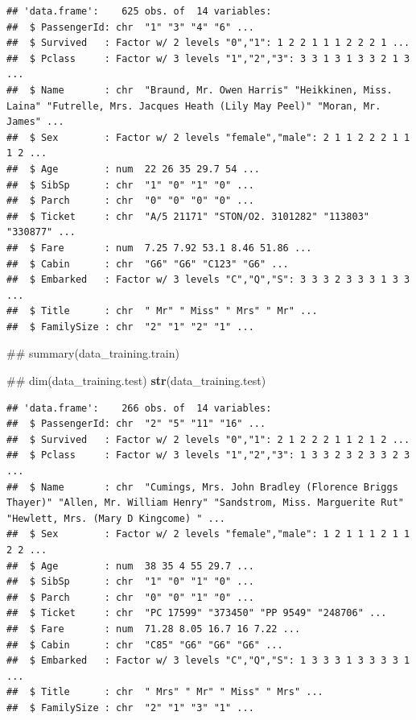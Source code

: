 \documentclass[]{article}
\newenvironment{Shaded}{\begin{snugshade}}{\end{snugshade}}
\newcommand{\KeywordTok}[1]{\textcolor[rgb]{0.13,0.29,0.53}{\textbf{{#1}}}}
\newcommand{\NormalTok}[1]{{#1}}
\begin{document}
\begin{verbatim}
## 'data.frame':    625 obs. of  14 variables:
##  $ PassengerId: chr  "1" "3" "4" "6" ...
##  $ Survived   : Factor w/ 2 levels "0","1": 1 2 2 1 1 1 2 2 2 1 ...
##  $ Pclass     : Factor w/ 3 levels "1","2","3": 3 3 1 3 1 3 3 2 1 3 ...
##  $ Name       : chr  "Braund, Mr. Owen Harris" "Heikkinen, Miss. Laina" "Futrelle, Mrs. Jacques Heath (Lily May Peel)" "Moran, Mr. James" ...
##  $ Sex        : Factor w/ 2 levels "female","male": 2 1 1 2 2 2 1 1 1 2 ...
##  $ Age        : num  22 26 35 29.7 54 ...
##  $ SibSp      : chr  "1" "0" "1" "0" ...
##  $ Parch      : chr  "0" "0" "0" "0" ...
##  $ Ticket     : chr  "A/5 21171" "STON/O2. 3101282" "113803" "330877" ...
##  $ Fare       : num  7.25 7.92 53.1 8.46 51.86 ...
##  $ Cabin      : chr  "G6" "G6" "C123" "G6" ...
##  $ Embarked   : Factor w/ 3 levels "C","Q","S": 3 3 3 2 3 3 3 1 3 3 ...
##  $ Title      : chr  " Mr" " Miss" " Mrs" " Mr" ...
##  $ FamilySize : chr  "2" "1" "2" "1" ...
\end{verbatim}

\begin{Shaded}
\begin{Highlighting}[]
\NormalTok{## summary(data_training.train)}

\NormalTok{## dim(data_training.test)}
\KeywordTok{str}\NormalTok{(data_training.test)}
\end{Highlighting}
\end{Shaded}

\begin{verbatim}
## 'data.frame':    266 obs. of  14 variables:
##  $ PassengerId: chr  "2" "5" "11" "16" ...
##  $ Survived   : Factor w/ 2 levels "0","1": 2 1 2 2 2 1 1 2 1 2 ...
##  $ Pclass     : Factor w/ 3 levels "1","2","3": 1 3 3 2 3 2 3 3 2 3 ...
##  $ Name       : chr  "Cumings, Mrs. John Bradley (Florence Briggs Thayer)" "Allen, Mr. William Henry" "Sandstrom, Miss. Marguerite Rut" "Hewlett, Mrs. (Mary D Kingcome) " ...
##  $ Sex        : Factor w/ 2 levels "female","male": 1 2 1 1 1 2 1 1 2 2 ...
##  $ Age        : num  38 35 4 55 29.7 ...
##  $ SibSp      : chr  "1" "0" "1" "0" ...
##  $ Parch      : chr  "0" "0" "1" "0" ...
##  $ Ticket     : chr  "PC 17599" "373450" "PP 9549" "248706" ...
##  $ Fare       : num  71.28 8.05 16.7 16 7.22 ...
##  $ Cabin      : chr  "C85" "G6" "G6" "G6" ...
##  $ Embarked   : Factor w/ 3 levels "C","Q","S": 1 3 3 3 1 3 3 3 3 1 ...
##  $ Title      : chr  " Mrs" " Mr" " Miss" " Mrs" ...
##  $ FamilySize : chr  "2" "1" "3" "1" ...
\end{verbatim}
\end{document}
